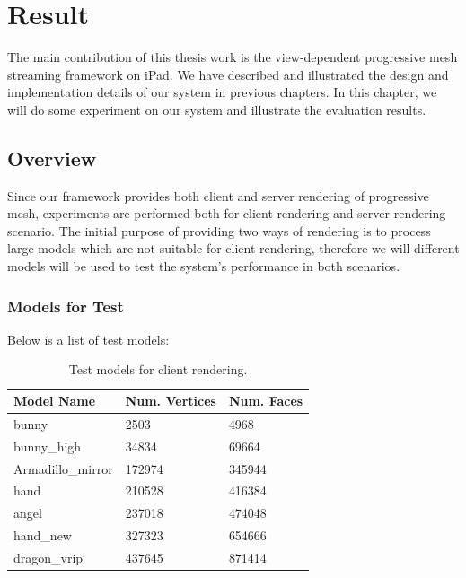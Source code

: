 \chapter{Result}
\label{chapter:result}
The main contribution of this thesis work is the view-dependent progressive mesh streaming framework on iPad. We have described and illustrated the design and implementation details of our system in previous chapters. In this chapter, we will do some experiment on our system and illustrate the evaluation results.  

\section{Overview}
\label{chapter:result:overview}
Since our framework provides both client and server rendering of progressive mesh, experiments are performed both for client rendering and server rendering scenario. The initial purpose of providing two ways of rendering is to process large models which are not suitable for client rendering, therefore we will different models will be used to test the system's performance in both scenarios. 
\subsection{Models for Test}
\label{chapter:result:overview:modelfortest}
Below is a list of test models: 
\begin{table}
\begin{center}
    \begin{tabular}{|	p{7.5cm}	|	l	|	l	|}
    \hline
    	\textbf{Model Name} 							& \textbf{Num. Vertices} 	& \textbf{Num. Faces}	\\ \hline
	bunny								&2503			&4968		\\ \hline
	bunny\_high							&34834			&69664		\\ \hline
	Armadillo\_mirror						&172974			&345944		\\ \hline
	hand									&210528			&416384		\\ \hline
	angel								&237018			&474048		\\ \hline
	hand\_new							&327323			&654666		\\ \hline
	dragon\_vrip							&437645			&871414		\\ \hline
    \end{tabular}
    \caption{Test models for client rendering.}
    \label{table:modelsclientrendering}
\end{center}
\end{table}

